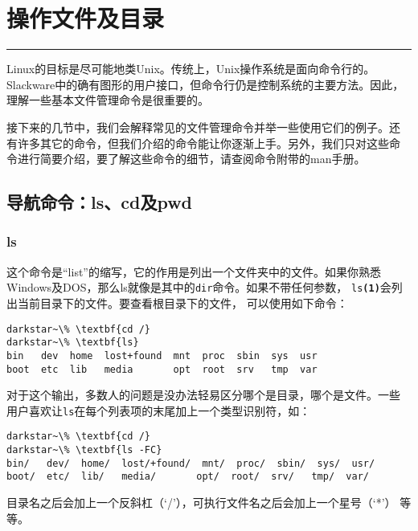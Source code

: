 
\chapter{操作文件及目录}
\label{chap:handlingFilesAndDirectories}

\begin{flushleft}
\rule[0mm]{\textwidth}{.1pt}
\end{flushleft}

Linux的目标是尽可能地类Unix。传统上，Unix操作系统是面向命令行的。
Slackware中的确有图形的用户接口，但命令行仍是控制系统的主要方法。因此，
理解一些基本文件管理命令是很重要的。

接下来的几节中，我们会解释常见的文件管理命令并举一些使用它们的例子。还
有许多其它的命令，但我们介绍的命令能让你逐渐上手。另外，我们只对这些命
令进行简要介绍，要了解这些命令的细节，请查阅命令附带的man手册。


\section{导航命令：ls、cd及pwd}
\label{sec:handlingFilesAndDirectories:navigation}

\subsection{ls}
\label{sec:handlingFilesAndDirectories:navigation:ls}
这个命令是``list''的缩写，它的作用是列出一个文件夹中的文件。如果你熟悉
Windows及DOS，那么ls就像是其中的\texttt{dir}命令。如果不带任何参数，
\texttt{ls\textbf{(1)}}会列出当前目录下的文件。要查看根目录下的文件，
可以使用如下命令：
\begin{Verbatim}[frame=single,commandchars=\\\{\}]
darkstar~\% \textbf{cd /}
darkstar~\% \textbf{ls}
bin   dev  home  lost+found  mnt  proc  sbin  sys  usr
boot  etc  lib   media       opt  root  srv   tmp  var
\end{Verbatim}

对于这个输出，多数人的问题是没办法轻易区分哪个是目录，哪个是文件。一些
用户喜欢让\texttt{ls}在每个列表项的末尾加上一个类型识别符，如：
\begin{Verbatim}[frame=single,commandchars=\\\{\}]
darkstar~\% \textbf{cd /}
darkstar~\% \textbf{ls -FC}
bin/   dev/  home/  lost/+found/  mnt/  proc/  sbin/  sys/  usr/
boot/  etc/  lib/   media/       opt/  root/  srv/   tmp/  var/
\end{Verbatim}
目录名之后会加上一个反斜杠（`/'），可执行文件名之后会加上一个星号（`*'）
等等。

